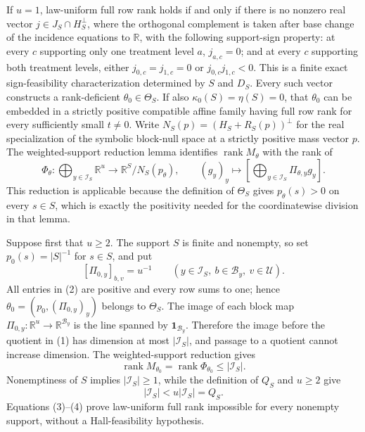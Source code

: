 If \(u=1\), law-uniform full row rank holds if and only if there is no nonzero real vector \(j\in J_S\cap H_S^\perp\), where the orthogonal complement is taken after base change of the incidence equations to \(\mathbb R\), with the following support-sign property: at every \(c\) supporting only one treatment level \(a\), \(j_{a,c}=0\); and at every \(c\) supporting both treatment levels, either \(j_{0,c}=j_{1,c}=0\) or \(j_{0,c}j_{1,c}<0\).  This is a finite exact sign-feasibility characterization determined by \(S\) and \(D_S\).  Every such vector constructs a rank-deficient \(\theta_0\in\Theta_S\).  If also \(\kappa_0(S)=\eta(S)=0\), that \(\theta_0\) can be embedded in a strictly positive compatible affine family having full row rank for every sufficiently small \(t\neq0\).
Write \(N_S(p)=(H_S+R_S(p))^\perp\) for the real specialization of the symbolic block-null space at a strictly positive mass vector \(p\).  The weighted-support reduction lemma identifies \(\operatorname{rank}M_\theta\) with the rank of
\[
\Phi_\theta:\bigoplus_{y\in\mathcal I_S}\mathbb R^u
\longrightarrow \mathbb R^S/N_S(p_\theta),
\qquad
(g_y)_y\longmapsto
\left[\bigoplus_{y\in\mathcal I_S}\Pi_{\theta,y}g_y\right].
\tag{1}
\]
This reduction is applicable because the definition of \(\Theta_S\) gives \(p_\theta(s)>0\) on every \(s\in S\), which is exactly the positivity needed for the coordinatewise division in that lemma.

Suppose first that \(u\geq2\).  The support \(S\) is finite and nonempty, so set \(p_0(s)=|S|^{-1}\) for \(s\in S\), and put
\[
[\Pi_{0,y}]_{b,v}=u^{-1}
\qquad
(y\in\mathcal I_S,\ b\in\mathcal B_y,\ v\in\mathcal U).
\tag{2}
\]
All entries in (2) are positive and every row sums to one; hence \(\theta_0=(p_0,(\Pi_{0,y})_y)\) belongs to \(\Theta_S\).  The image of each block map \(\Pi_{0,y}:\mathbb R^u\to\mathbb R^{\mathcal B_y}\) is the line spanned by \(\mathbf1_{\mathcal B_y}\).  Therefore the image before the quotient in (1) has dimension at most \(|\mathcal I_S|\), and passage to a quotient cannot increase dimension.  The weighted-support reduction gives
\[
\operatorname{rank}M_{\theta_0}
=\operatorname{rank}\Phi_{\theta_0}
\leq |\mathcal I_S|.
\tag{3}
\]
Nonemptiness of \(S\) implies \(|\mathcal I_S|\geq1\), while the definition of \(Q_S\) and \(u\geq2\) give
\[
|\mathcal I_S|<u|\mathcal I_S|=Q_S.
\tag{4}
\]
Equations (3)--(4) prove law-uniform full rank impossible for every nonempty support, without a Hall-feasibility hypothesis.

